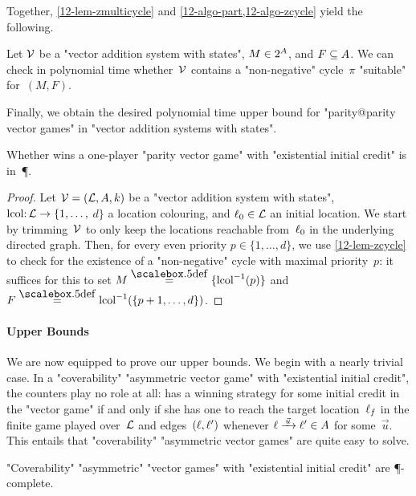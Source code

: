 \begin{scope}
Together, \cref{12-lem-zmulticycle}
and \cref{12-algo-part,12-algo-zcycle} yield the following.

\begin{lemma}\label{12-lem-zcycle}
  Let $\mathcal V$ be a "vector addition system with states",
  $M\in 2^{A}$, and $F\subseteq A$.  We can check in polynomial
  time whether~$\mathcal V$ contains a "non-negative" cycle~$\pi$
  "suitable" for~$(M,F)$.
\end{lemma}

Finally, we obtain the desired polynomial time upper bound for
"parity@parity vector games" in "vector addition systems with states".
\begin{theorem}\label{12-thm-zcycle}
  Whether \Eve wins a one-player "parity vector game" with
  "existential initial credit" is in~\P.
\end{theorem}
\begin{proof}
  Let $\mathcal V=(\mathcal L,A,k)$ be a "vector addition system with states",
  $\mathrm{lcol}{:}\,\mathcal L\to\{1,\dots,$ $d\}$ a location colouring, and
  $\ell_0\in\mathcal L$ an initial location.  We start by trimming~$\mathcal V$ to
  only keep the locations reachable from~$\ell_0$ in the underlying
  directed graph.  Then, for every even priority $p\in\{1,\dots,d\}$,
  we use \cref{12-lem-zcycle} to check for the existence of a
  "non-negative" cycle with maximal priority~$p$: it suffices for this
  to set $M\eqdef\{\lcol^{-1}(p)\}$ and
  $F\eqdef\lcol^{-1}(\{p+1,\dots,d\})$.
\end{proof}
\end{scope}

\paragraph{Upper Bounds}
We are now equipped to prove our upper bounds.  We begin with a nearly
trivial case.  In a "coverability" "asymmetric vector game" with
"existential initial credit", the counters play no role at all: \Eve
has a winning strategy for some initial credit in the "vector game" if
and only if she has one to reach the target location~$\ell_f$ in the
finite game played over~$\mathcal L$ and edges~$(\ell,\ell')$ whenever
$\loc\step{\vec u}\loc'\in\Act$ for some~$\vec u$.  This entails that
"coverability" "asymmetric vector games" are quite easy to solve.

\begin{theorem}\label{12-cov-exist-P}
  "Coverability" "asymmetric" "vector games" with "existential initial
  credit" are \P-complete.
\end{theorem}

